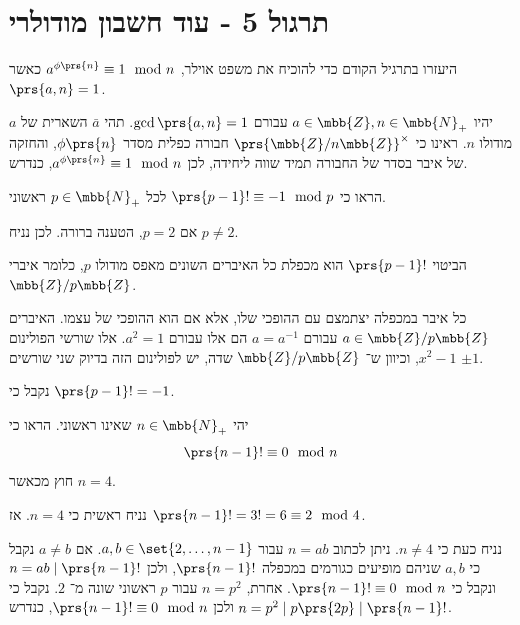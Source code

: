\documentclass[a4paper,10pt,twoside,openany]{book}
\begin{document}
\chapter{תרגול 5 - עוד חשבון מודולרי}

\begin{exercisechap}
היעזרו בתרגיל הקודם כדי להוכיח את משפט אוילר,
$a^{\phi\prs{n}} \equiv 1 \mod{n}$
כאשר
$\prs{a,n} = 1$.
\end{exercisechap}

\begin{solution}
יהיו
$a \in \mbb{Z}, n \in \mbb{N}_+$
עבורם
$\gcd\prs{a,n} = 1$.
תהי
$\bar{a}$
השארית של
$a$
מודולו
$n$.
ראינו כי
$\prs{\mbb{Z} / n\mbb{Z}}^\times$
חבורה כפלית מסדר
$\phi\prs{n}$,
והחזקה של איבר בסדר של החבורה תמיד שווה ליחידה, לכן
$a^{\phi\prs{n}} \equiv 1 \mod{n}$,
כנדרש.
\end{solution}

\begin{exercisechap}
הראו כי
$\prs{p-1}! \equiv -1 \mod{p}$
לכל
$p \in \mbb{N}_+$
ראשוני.
\end{exercisechap}

\begin{solution}
אם
$p = 2$,
הטענה ברורה. לכן נניח
$p \neq 2$.

הביטוי
$\prs{p-1}!$
הוא מכפלת כל האיברים השונים מאפס מודולו
$p$,
כלומר איברי
$\mbb{Z} / p\mbb{Z}$.

כל איבר במכפלה יצתמצם עם ההופכי שלו, אלא אם הוא ההופכי של עצמו.
האיברים
$a \in \mbb{Z} / p\mbb{Z}$
עבורם
$a = a^{-1}$
הם אלו עבורם
$a^2 = 1$.
אלו שורשי הפולינום
$x^2 - 1$,
וכיוון ש־%
$\mbb{Z} / p\mbb{Z}$
שדה, יש לפולינום הזה בדיוק שני שורשים
$\pm 1$.

נקבל כי
$\prs{p-1}! = -1$.
\end{solution}

\begin{exercisechap}
יהי
$n \in \mbb{N}_+$
שאינו ראשוני. הראו כי
\[\prs{n-1}! \equiv 0 \mod{n}\]
חוץ מכאשר
$n = 4$.
\end{exercisechap}

\begin{solution}
נניח ראשית כי
$n = 4$.
אז
$\prs{n-1}! = 3! = 6 \equiv 2 \mod{4}$.

נניח כעת כי
$n \neq 4$.
ניתן לכתוב
$n = ab$
עבור
$a,b \in \set{2, \ldots, n-1}$.
אם
$a \neq b$
נקבל כי
$a,b$
שניהם מופיעים כגורמים במכפלה
$\prs{n-1}!$,
ולכן
$n = ab \mid \prs{n-1}!$
ונקבל כי
$\prs{n-1}! \equiv 0 \mod{n}$.
אחרת,
$n = p^2$
עבור
$p$
ראשוני שונה מ־%
$2$.
נקבל כי
$n = p^2 \mid p \prs{2p} \mid \prs{n-1}!$
ולכן
$\prs{n-1}! \equiv 0 \mod{n}$,
כנדרש.
\end{solution}
\end{document}
